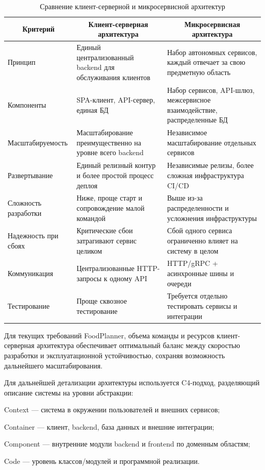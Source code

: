 \begin{table}[H]
\caption{Сравнение клиент-серверной и микросервисной архитектур}
\label{tab:arch-compare}
\small
\begin{tabularx}{\textwidth}{|p{}|p{}|X|}
\hline
\multicolumn{1}{|c|}{Критерий} & \multicolumn{1}{c|}{Клиент-серверная архитектура} & \multicolumn{1}{c|}{Микросервисная архитектура} \\ \hline
Принцип & Единый централизованный backend для обслуживания клиентов & Набор автономных сервисов, каждый отвечает за свою предметную область \\ \hline
Компоненты & SPA-клиент, API-сервер, единая БД & Набор сервисов, API-шлюз, межсервисное взаимодействие, распределенные БД \\ \hline
Масштабируемость & Масштабирование преимущественно на уровне всего backend & Независимое масштабирование отдельных сервисов \\ \hline
Развертывание & Единый релизный контур и более простой процесс деплоя & Независимые релизы, более сложная инфраструктура CI/CD \\ \hline
Сложность разработки & Ниже, проще старт и сопровождение малой командой & Выше из-за распределенности и усложнения инфраструктуры \\ \hline
Надежность при сбоях & Критические сбои затрагивают сервис целиком & Сбой одного сервиса ограниченно влияет на систему в целом \\ \hline
Коммуникация & Централизованные HTTP-запросы к одному API & HTTP/gRPC + асинхронные шины и очереди \\ \hline
Тестирование & Проще сквозное тестирование & Требуется отдельно тестировать сервисы и интеграции \\ \hline
\end{tabularx}
\normalsize
\end{table}

Для текущих требований FoodPlanner, объема команды и ресурсов клиент-серверная архитектура обеспечивает оптимальный баланс между скоростью разработки и эксплуатационной устойчивостью, сохраняя возможность дальнейшего масштабирования.

Для дальнейшей детализации архитектуры используется C4-подход, разделяющий описание системы на уровни абстракции:
\begin{compactlist}
  \item Context --- система в окружении пользователей и внешних сервисов;
  \item Container --- клиент, backend, база данных и внешние интеграции;
  \item Component --- внутренние модули backend и frontend по доменным областям;
  \item Code --- уровень классов/модулей и программной реализации.
\end{compactlist}

